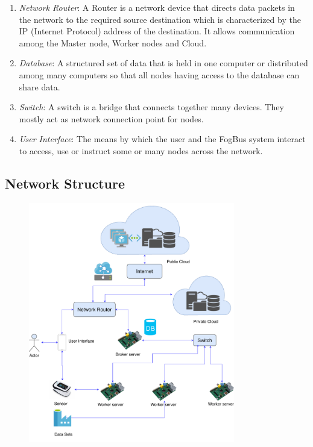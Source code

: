 \documentclass[10pt,journal,compsoc]{IEEEtran}
\begin{document}
\begin{enumerate}
\item \textit{Network Router}: A Router is a network device that directs data packets in the network to the required source destination which is characterized by the IP (Internet Protocol) address of the destination. It allows communication among the Master node, Worker nodes and Cloud.
\item \textit{Database}: A structured set of data that is held in one computer or distributed among many computers so that all nodes having access to the database can share data.
\item \textit{Switch}: A switch is a bridge that connects together many devices. They mostly act as network connection point for nodes.
\item \textit{User Interface}: The means by which the user and the FogBus system interact to access, use or instruct some or many nodes across the network. 
\end{enumerate}

\subsection{Network Structure}
\begin{figure}[h]
\centering
\includegraphics[width=9cm]{network-arch}
\end{figure}
\end{document}

